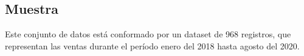 \subsection{Muestra}
Este conjunto de datos está conformado por un dataset de 968 registros, que representan las ventas durante el período enero del 2018 hasta agosto del 2020.

